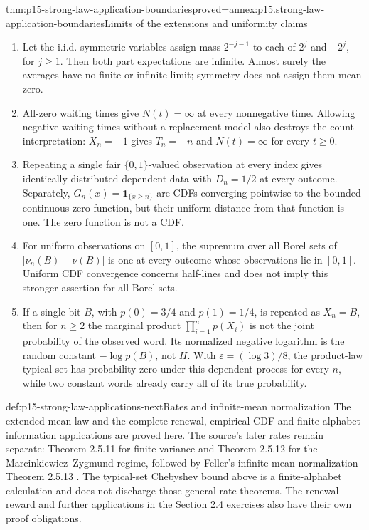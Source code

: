 \begin{hbtheorem}{thm:p15-strong-law-application-boundaries}{proved=annex:p15.strong-law-application-boundaries}{Limits of the extensions and uniformity claims}
\begin{enumerate}
\item Let the i.i.d. symmetric variables assign mass \(2^{-j-1}\)
to each of \(2^j\) and \(-2^j\), for \(j\geq1\). Then
both part expectations are infinite. Almost surely the averages have
no finite or infinite limit; symmetry does not assign them mean zero.
\item All-zero waiting times give \(N(t)=\infty\) at every
nonnegative time. Allowing negative waiting times without a replacement
model also destroys the count interpretation: \(X_n=-1\) gives
\(T_n=-n\) and \(N(t)=\infty\) for every \(t\geq0\).
\item Repeating a single fair \(\{0,1\}\)-valued observation at
every index gives identically distributed dependent data with
\(D_n=1/2\) at every outcome. Separately, \(G_n(x)=\mathbf1_{\{x\geq n\}}\)
are CDFs converging pointwise to the bounded continuous zero function,
but their uniform distance from that function is one. The zero function
is not a CDF.
\item For uniform observations on \([0,1]\), the supremum over
all Borel sets of \(|\nu_n(B)-\nu(B)|\) is one at every outcome
whose observations lie in \([0,1]\). Uniform CDF convergence concerns
half-lines and does not imply this stronger assertion for all Borel sets.
\item If a single bit \(B\), with \(p(0)=3/4\) and \(p(1)=1/4\),
is repeated as \(X_n=B\), then for \(n\geq2\) the marginal product
\(\prod_{i=1}^np(X_i)\) is not the joint probability of the observed
word. Its normalized negative logarithm is the random constant
\(-\log p(B)\), not \(H\). With \(\varepsilon=(\log3)/8\),
the product-law typical set has probability zero under this dependent
process for every \(n\), while two constant words already carry all
of its true probability.
\end{enumerate}
\end{hbtheorem}

\begin{proofboundary}{def:p15-strong-law-applications-next}{Rates and infinite-mean normalization}
The extended-mean law and the complete renewal, empirical-CDF and
finite-alphabet information applications are proved here. The source's
later rates remain separate: Theorem 2.5.11 for finite variance and
Theorem 2.5.12 for the Marcinkiewicz--Zygmund regime, followed by
Feller's infinite-mean normalization Theorem 2.5.13
\cite[pp.~87--90]{DurrettPTEAuthor2019}. The typical-set Chebyshev
bound above is a finite-alphabet calculation and does not discharge
those general rate theorems. The renewal-reward and further applications
in the Section 2.4 exercises also have their own proof obligations.
\end{proofboundary}
